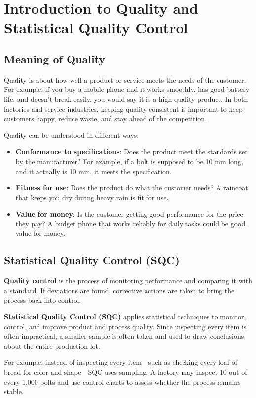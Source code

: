 \documentclass[twoside]{book}
\begin{document}
\section{Introduction to Quality and Statistical Quality Control}

\subsection{Meaning of Quality}

Quality is about how well a product or service meets the needs of the customer. For example, if you buy a mobile phone and it works smoothly, has good battery life, and doesn't break easily, you would say it is a high-quality product. In both factories and service industries, keeping quality consistent is important to keep customers happy, reduce waste, and stay ahead of the competition.

Quality can be understood in different ways:
\begin{itemize}
    \item \textbf{Conformance to specifications}: Does the product meet the standards set by the manufacturer? For example, if a bolt is supposed to be 10 mm long, and it actually is 10 mm, it meets the specification.
    \item \textbf{Fitness for use}: Does the product do what the customer needs? A raincoat that keeps you dry during heavy rain is fit for use.
    \item \textbf{Value for money}: Is the customer getting good performance for the price they pay? A budget phone that works reliably for daily tasks could be good value for money.
\end{itemize}

\subsection{Statistical Quality Control (SQC)}

\textbf{Quality control} is the process of monitoring performance and comparing it with a standard. If deviations are found, corrective actions are taken to bring the process back into control.

\textbf{Statistical Quality Control (SQC)} applies statistical techniques to monitor, control, and improve product and process quality. Since inspecting every item is often impractical, a smaller sample is often taken and used to draw conclusions about the entire production lot.

For example, instead of inspecting every item—such as checking every loaf of bread for color and shape—SQC uses sampling. A factory may inspect 10 out of every 1,000 bolts and use control charts to assess whether the process remains stable.
\end{document}
